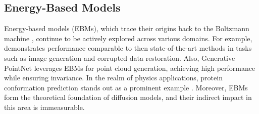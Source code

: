 \subsection{Energy-Based Models}
Energy-based models (EBMs), which trace their origins back to the Boltzmann machine \cite{Boltzman_Machine}, continue to be actively explored across various domains. For example, \cite{EBM_OpenAI} demonstrates performance comparable to then state-of-the-art methods in tasks such as image generation and corrupted data restoration. Also, Generative PointNet \cite{Generative_PointNet} leverages EBMs for point cloud generation, achieving high performance while ensuring invariance. In the realm of physics applications, protein conformation prediction stands out as a prominent example \cite{EBM_Meta}. Moreover, EBMs form the theoretical foundation of diffusion models, and their indirect impact in this area is immeasurable.